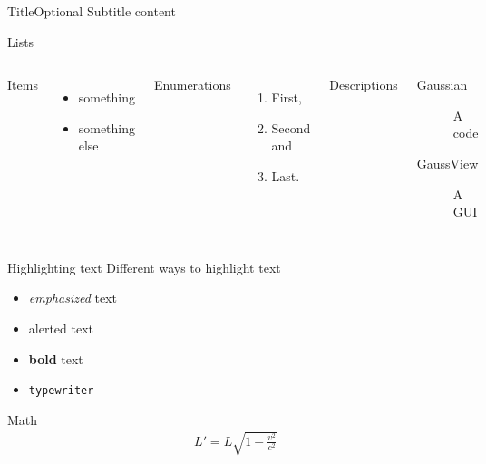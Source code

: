 \documentclass[xcolor={dvipsnames},10pt]{beamer}
\subtitle{Tutorial day X}
\author{Your~name}
\begin{document}
\begin{frame}
    \titlepage
\end{frame}

\begin{frame}{Title}{Optional Subtitle}
    content
\end{frame}

\begin{frame}{Lists}
    \begin{columns}[T,onlytextwidth]
        Items
        \begin{itemize}
            \item something \item something else
        \end{itemize}

        Enumerations
        \begin{enumerate}
            \item First, \item Second and \item Last.
        \end{enumerate}

        Descriptions
        \begin{description}
            \item[Gaussian] A code \item[GaussView] A GUI
        \end{description}
    \end{columns}
\end{frame}

\begin{frame}{Highlighting text}
    Different ways to highlight text
    \begin{itemize}
        \item
            \emph{emphasized} text
        \item
            \alert{alerted} text
        \item
            \textbf{bold} text
        \item
            \texttt{typewriter}
    \end{itemize}
\end{frame}

\begin{frame}{Math}
    \begin{align*}
        L' = {L}{\sqrt{1-\frac{v^2}{c^2}}}
    \end{align*}
\end{frame}
\end{document}
